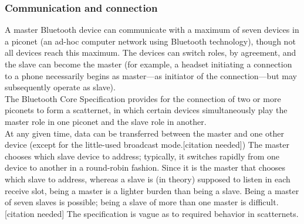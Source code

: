 \subsubsection{Communication and connection}
A master Bluetooth device can communicate with a maximum of seven devices in a piconet (an ad-hoc computer network using Bluetooth technology), though not all devices reach this maximum. The devices can switch roles, by agreement, and the slave can become the master (for example, a headset initiating a connection to a phone necessarily begins as master—as initiator of the connection—but may subsequently operate as slave).\\
The Bluetooth Core Specification provides for the connection of two or more piconets to form a scatternet, in which certain devices simultaneously play the master role in one piconet and the slave role in another.\\
At any given time, data can be transferred between the master and one other device (except for the little-used broadcast mode.[citation needed]) The master chooses which slave device to address; typically, it switches rapidly from one device to another in a round-robin fashion. Since it is the master that chooses which slave to address, whereas a slave is (in theory) supposed to listen in each receive slot, being a master is a lighter burden than being a slave. Being a master of seven slaves is possible; being a slave of more than one master is difficult.[citation needed] The specification is vague as to required behavior in scatternets.
